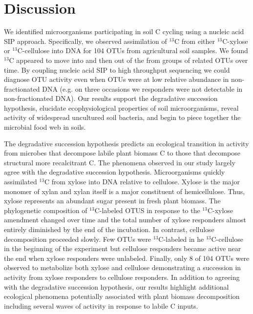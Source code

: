 \section{Discussion} 
We identified microorganisms participating in soil C cycling using a nucleic
acid SIP approach. Specifically, we observed assimilation of $^{13}$C from
either $^{13}$C-xylose or $^{13}$C-cellulose into DNA for 104 OTUs from
agricultural soil samples. We found $^{13}$C appeared to move into and then out
of the from groups of related OTUs over time. By coupling nucleic acid SIP to
high throughput sequencing we could diagnose OTU activity even when OTUs were
at low relative abundance in non-fractionated DNA (e.g. on three occasions we
responders were not detectable in non-fractionated DNA). Our results support
the degradative succession hypothesis, elucidate ecophysiological properties of
soil microorganisms, reveal activity of widespread uncultured soil bacteria,
and begin to piece together the microbial food web in soils. 

The degradative succession hypothesis predicts an ecological transition in
activity from microbes that decompose labile plant biomass C to those that
decompose structural more recalcitrant C. The phenomena observed in our study
largely agree with the degradative succession hypothesis. Microorganisms
quickly assimilated $^{13}$C from xylose into DNA relative to cellulose. Xylose
is the major monomer of xylan and xylan itself is a major constituent of
hemicellulose. Thus, xylose represents an abundant sugar present in fresh plant
biomass. The phylogenetic composition of $^{13}$C-labeled OTUS in response to
the $^{13}$C-xylose amendment changed over time and the total number of xylose
responders almost entirely diminished by the end of the incubation. In
contrast, cellulose decomposition proceeded slowly. Few OTUs were
$^{13}$C-labeled in he $^{13}$C-cellulose in the beginning of the experiment
but cellulose responders became active near the end when xylose responders were
unlabeled. Finally, only 8 of 104 OTUs were observed to metabolize both xylose
and cellulose demonstrating a succession in activity from xylose responders to
cellulose responders. In addition to agreeing with the degradative succession
hypothesis, our results highlight additional ecological phenomena potentially
associated with plant biomass decomposition including several waves of activity
in response to labile C inputs.  

